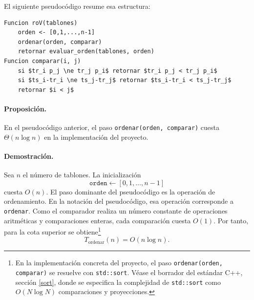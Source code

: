 \documentclass[12pt,a4paper]{article}
\begin{document}
El siguiente pseudoc\'odigo resume esa estructura:

\begin{center}
\begin{minipage}{0.88\textwidth}
\begin{lstlisting}[mathescape=true,basicstyle=\ttfamily\normalsize\linespread{1.12}\selectfont,aboveskip=0.8em,belowskip=0.8em]
Funcion roV(tablones)
    orden <- [0,1,...,n-1]
    ordenar(orden, comparar)
    retornar evaluar_orden(tablones, orden)
Funcion comparar(i, j)
    si $tr_i p_j \ne tr_j p_i$ retornar $tr_i p_j < tr_j p_i$
    si $ts_i-tr_i \ne ts_j-tr_j$ retornar $ts_i-tr_i < ts_j-tr_j$
    retornar $i < j$
\end{lstlisting}
\end{minipage}
\end{center}

\paragraph{Proposici\'on.}
En el pseudoc\'odigo anterior, el paso \texttt{ordenar(orden, comparar)} cuesta \(\Theta(n\log n)\) en la implementaci\'on del proyecto.

\paragraph{Demostraci\'on.}
Sea \(n\) el n\'umero de tablones. La inicializaci\'on
\[
\texttt{orden} \leftarrow [0,1,\dots,n-1]
\]
cuesta \(O(n)\). El paso dominante del pseudoc\'odigo es la operaci\'on de ordenamiento. En la notaci\'on del pseudoc\'odigo, esa operaci\'on corresponde a \texttt{ordenar}. Como el comparador realiza un n\'umero constante de operaciones aritm\'eticas y comparaciones enteras, cada comparaci\'on cuesta \(O(1)\). Por tanto, para la cota superior se obtiene\footnote{En la implementaci\'on concreta del proyecto, el paso \texttt{ordenar(orden, comparar)} se resuelve con \texttt{std::sort}. V\'ease el borrador del est\'andar C++, secci\'on \href{https://eel.is/c++draft/sort}{[sort]}, donde se especifica la complejidad de \texttt{std::sort} como \(O(N\log N)\) comparaciones y proyecciones.}
\[
T_{\text{ordenar}}(n)=O(n\log n).
\]
\end{document}
